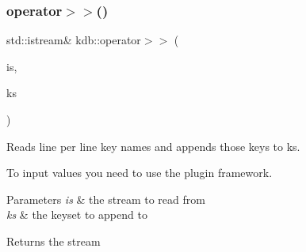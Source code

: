 \subsubsection{\texorpdfstring{operator$>$$>$()}{operator>>()}\hspace{0.1cm}{\footnotesize\ttfamily [2/2]}}
{\footnotesize\ttfamily std\+::istream\& kdb\+::operator$>$$>$ (\begin{DoxyParamCaption}\item[{std\+::istream \&}]{is,  }\item[{\hyperlink{classkdb_1_1KeySet}{kdb\+::\+Key\+Set} \&}]{ks }\end{DoxyParamCaption})\hspace{0.3cm}{\ttfamily [inline]}}



Reads line per line key names and appends those keys to ks. 

To input values you need to use the plugin framework.


\begin{DoxyParams}{Parameters}
{\em is} & the stream to read from \\
\hline
{\em ks} & the keyset to append to\\
\hline
\end{DoxyParams}
\begin{DoxyReturn}{Returns}
the stream 
\end{DoxyReturn}
